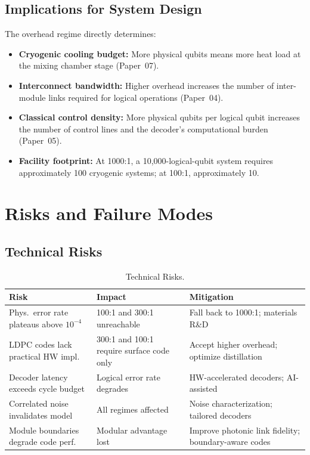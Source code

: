 \documentclass[conference]{IEEEtran}
\begin{document}
\subsection{Implications for System Design}

The overhead regime directly determines:

\begin{itemize}
\item \textbf{Cryogenic cooling budget:} More physical qubits means more heat load at the mixing chamber stage (Paper~07).
\item \textbf{Interconnect bandwidth:} Higher overhead increases the number of inter-module links required for logical operations (Paper~04).
\item \textbf{Classical control density:} More physical qubits per logical qubit increases the number of control lines and the decoder's computational burden (Paper~05).
\item \textbf{Facility footprint:} At 1000:1, a 10,000-logical-qubit system requires approximately 100 cryogenic systems; at 100:1, approximately 10.
\end{itemize}

\section{Risks and Failure Modes}

\subsection{Technical Risks}

\begin{table}[htbp]
\centering
\caption{Technical Risks.}
\label{tab:tech_risks}
\begin{tabular}{lp{3cm}p{3cm}}
\toprule
\textbf{Risk} & \textbf{Impact} & \textbf{Mitigation} \\
\midrule
Phys.\ error rate plateaus above $10^{-4}$ & 100:1 and 300:1 unreachable & Fall back to 1000:1; materials R\&D \\
LDPC codes lack practical HW impl. & 300:1 and 100:1 require surface code only & Accept higher overhead; optimize distillation \\
Decoder latency exceeds cycle budget & Logical error rate degrades & HW-accelerated decoders; AI-assisted \\
Correlated noise invalidates model & All regimes affected & Noise characterization; tailored decoders \\
Module boundaries degrade code perf. & Modular advantage lost & Improve photonic link fidelity; boundary-aware codes \\
\bottomrule
\end{tabular}
\end{table}
\end{document}
